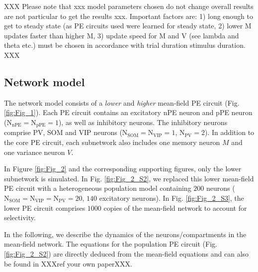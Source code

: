 \documentclass[10pt,a4paper,draft]{article}
\begin{document}
XXX Please note that xxx model parameters chosen do not change overall results are not particular to get the results xxx. Important factors are: 1) long enough to get to steady state (as PE circuits used were learned for steady state, 2) lower M updates faster than higher M, 3) update speed for M and V (see lambda and theta etc.) must be chosen in accordance with trial duration stimulus duration. XXX


\subsection{Network model}
%
The network model consists of a \textit{lower} and \textit{higher} mean-field PE circuit (Fig. \ref{fig:Fig_1}). Each PE circuit contains an excitatory nPE neuron and pPE neuron ($\mathrm{N}_\mathrm{nPE} = \mathrm{N}_\mathrm{pPE} = 1$), as well as inhibitory neurons. The inhibitory neurons comprise PV, SOM and VIP neurons ($\mathrm{N}_\mathrm{SOM} = \mathrm{N}_\mathrm{VIP} = 1$, $\mathrm{N}_\mathrm{PV} = 2$). In addition to the core PE circuit, each subnetwork also includes one memory neuron $M$ and one variance neuron $V$. 

In Figure \ref{fig:Fig_2} and the corresponding supporting figures, only the lower subnetwork is simulated. In Fig. \ref{fig:Fig_2_S2}, we replaced this lower mean-field PE circuit with a heterogeneous population model containing $200$ neurons ($\mathrm{N}_\mathrm{SOM} = \mathrm{N}_\mathrm{VIP} = \mathrm{N}_\mathrm{PV} = 20$, $140$ excitatory neurons). In Fig. \ref{fig:Fig_2_S3}, the lower PE circuit comprises $1000$ copies of the mean-field network to account for selectivity.

In the following, we describe the dynamics of the neurons/compartments in the mean-field network. The equations for the population PE circuit (Fig. \ref{fig:Fig_2_S2}) are directly deduced from the mean-field equations and can also be found in XXXref your own paperXXX.
\end{document}
